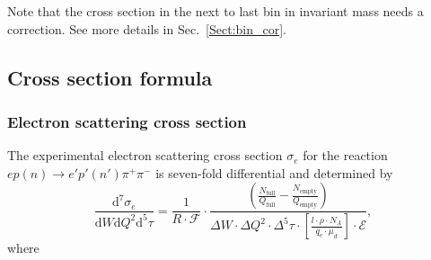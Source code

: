 \documentclass[prc,twocolumn,superscriptaddress,showpacs,amssymb,amsmath,amsfonts,aps,nofootinbib]{revtex4-1}
\begin{document}
Note that the cross section in the next to last bin in invariant mass needs a correction. See more details in Sec.\!~\ref{Sect:bin_cor}.

\subsection{Cross section formula}
\label{Sect:cr_sect_formula}

\subsubsection{Electron scattering cross section}

The experimental electron scattering cross section $\sigma_{e}$ for the reaction $ep(n) \rightarrow e'p'(n') \pi^{+} \pi^{-}$ is seven-fold differential and determined by
\begin{equation}
\frac{\textrm{d}^{7}\sigma_{e}}{\textrm{d}W\textrm{d}Q^{2}\textrm{d}^{5}\tau} = \frac{1}{ R \! \cdot \! \mathcal{F}}  \cdot 
\frac{\left( \frac{N_{\text{full}}}{Q_{\text{full}}}-\frac{N_{\text{empty}}}{Q_{\text{empty}}} \right)}{
\Delta W \! \cdot \! \Delta Q^{2} \! \cdot \! \Delta^{5} \tau \! \cdot \! \left[ \frac{l \cdot \rho \cdot N_{A}}{q_{e}\cdot \mu_{d}} \right]\! \cdot \!\mathcal{E}},
\label{expcrossect}
\end{equation}
where
\end{document}
